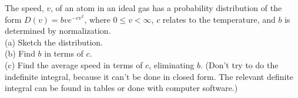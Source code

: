 The speed, $v$, of an atom in an ideal gas has a probability
distribution of the form
$D(v) = bve^{-cv^2}$,
where $0\le v < \infty$,
$c$ relates to the temperature, and $b$ is determined
by normalization.\\
(a) Sketch the distribution.\\
(b) Find $b$ in terms of $c$.\answercheck\hwendpart\\
(c) Find the average speed in terms of $c$, eliminating
$b$. (Don't try to do the indefinite
integral, because it can't be done in closed form. The
relevant definite integral can be found in tables or done
with computer software.)\answercheck
